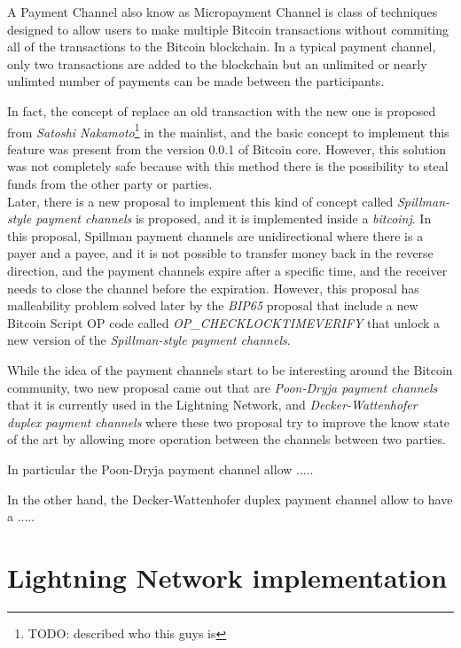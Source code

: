 A Payment Channel also know as Micropayment Channel is class of techniques designed to allow users to make multiple
Bitcoin transactions without commiting all of the transactions to the Bitcoin blockchain. In a typical payment channel,
only two transactions are added to the blockchain but an unlimited or nearly unlimted number of payments
can be made between the participants.

In fact, the concept of replace an old transaction with the new one is proposed from \emph{Satoshi Nakamoto}\footnote{TODO: described who this guys is} in the mainlist\cite{payment-channels-satoshi}, and
the basic concept to implement this feature was present from the version 0.0.1 of Bitcoin core. However, this solution
was not completely safe because with this method there is the possibility to steal funds from the other party or parties.\\

Later, there is a new proposal to implement this kind of concept called \emph{Spillman-style payment channels} is proposed, and it is
implemented inside a \emph{bitcoinj}\cite{bitcoinj-impl}. In this proposal, Spillman payment channels are unidirectional where
there is a payer and a payee, and it is not possible to transfer money back in the reverse direction, and the payment
channels expire after a specific time, and the receiver needs to close the channel before the expiration. However, this
proposal has malleability problem solved later by the \emph{BIP65}\cite{bip65} proposal that include a new Bitcoin Script OP code
called \emph{OP\_CHECKLOCKTIMEVERIFY} that unlock a new version of the \emph{Spillman-style payment channels}.

While the idea of the payment channels start to be interesting around the Bitcoin community, two new proposal came out that are
\emph{Poon-Dryja payment channels}\cite{lightning-network-paper} that it is currently used in the Lightning Network,
and \emph{Decker-Wattenhofer duplex payment channels}\cite{Decker2015fast} where these two proposal try to improve the know state
of the art by allowing more operation between the channels between two parties.

In particular the Poon-Dryja payment channel allow .....


In the other hand, the Decker-Wattenhofer duplex payment channel allow to have a .....

\section{Lightning Network implementation}

